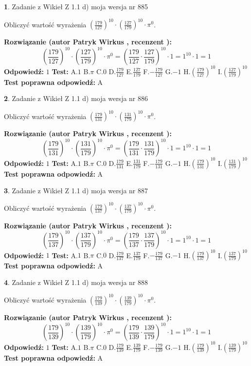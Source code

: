 \documentclass[12pt, a4paper]{article}
\theoremstyle{definition} %
\newtheorem{zad}{}
\newcommand{\zadStart}[1]{\begin{zad}#1\newline}
\newcommand{\zadStop}{\end{zad}}
\newcommand{\rozwStart}[2]{\noindent \textbf{Rozwiązanie (autor #1 , recenzent #2): }\newline}
\newcommand{\rozwStop}{\newline}
\newcommand{\odpStart}{\noindent \textbf{Odpowiedź:}\newline}
\newcommand{\odpStop}{\newline}
\newcommand{\testStart}{\noindent \textbf{Test:}\newline}
\newcommand{\testStop}{\newline}
\newcommand{\kluczStart}{\noindent \textbf{Test poprawna odpowiedź:}\newline}
\newcommand{\kluczStop}{\newline}
\begin{document}
\zadStart{Zadanie z Wikieł Z 1.1 d) moja wersja nr 885}

Obliczyć wartość wyrażenia $(\frac{179}{127})^{10} \cdot (\frac{127}{179})^{10} \cdot \pi^{0}$.
\zadStop
\rozwStart{Patryk Wirkus}{}
$$(\frac{179}{127})^{10} \cdot (\frac{127}{179})^{10} \cdot \pi^{0} = (\frac{179}{127} \cdot \frac{127}{179})^{10} \cdot 1 = 1^{10} \cdot 1 = 1$$
\rozwStop
\odpStart
$1$
\odpStop
\testStart
A.$1$ B.$\pi$ C.$0$ D.$\frac{179}{127}$ E.$\frac{127}{179}$
F.$-\frac{179}{127}$ G.$-1$
H.$(\frac{179}{127})^{10}$
I.$(\frac{127}{179})^{10}$
\testStop
\kluczStart
A
\kluczStop



\zadStart{Zadanie z Wikieł Z 1.1 d) moja wersja nr 886}

Obliczyć wartość wyrażenia $(\frac{179}{131})^{10} \cdot (\frac{131}{179})^{10} \cdot \pi^{0}$.
\zadStop
\rozwStart{Patryk Wirkus}{}
$$(\frac{179}{131})^{10} \cdot (\frac{131}{179})^{10} \cdot \pi^{0} = (\frac{179}{131} \cdot \frac{131}{179})^{10} \cdot 1 = 1^{10} \cdot 1 = 1$$
\rozwStop
\odpStart
$1$
\odpStop
\testStart
A.$1$ B.$\pi$ C.$0$ D.$\frac{179}{131}$ E.$\frac{131}{179}$
F.$-\frac{179}{131}$ G.$-1$
H.$(\frac{179}{131})^{10}$
I.$(\frac{131}{179})^{10}$
\testStop
\kluczStart
A
\kluczStop



\zadStart{Zadanie z Wikieł Z 1.1 d) moja wersja nr 887}

Obliczyć wartość wyrażenia $(\frac{179}{137})^{10} \cdot (\frac{137}{179})^{10} \cdot \pi^{0}$.
\zadStop
\rozwStart{Patryk Wirkus}{}
$$(\frac{179}{137})^{10} \cdot (\frac{137}{179})^{10} \cdot \pi^{0} = (\frac{179}{137} \cdot \frac{137}{179})^{10} \cdot 1 = 1^{10} \cdot 1 = 1$$
\rozwStop
\odpStart
$1$
\odpStop
\testStart
A.$1$ B.$\pi$ C.$0$ D.$\frac{179}{137}$ E.$\frac{137}{179}$
F.$-\frac{179}{137}$ G.$-1$
H.$(\frac{179}{137})^{10}$
I.$(\frac{137}{179})^{10}$
\testStop
\kluczStart
A
\kluczStop



\zadStart{Zadanie z Wikieł Z 1.1 d) moja wersja nr 888}

Obliczyć wartość wyrażenia $(\frac{179}{139})^{10} \cdot (\frac{139}{179})^{10} \cdot \pi^{0}$.
\zadStop
\rozwStart{Patryk Wirkus}{}
$$(\frac{179}{139})^{10} \cdot (\frac{139}{179})^{10} \cdot \pi^{0} = (\frac{179}{139} \cdot \frac{139}{179})^{10} \cdot 1 = 1^{10} \cdot 1 = 1$$
\rozwStop
\odpStart
$1$
\odpStop
\testStart
A.$1$ B.$\pi$ C.$0$ D.$\frac{179}{139}$ E.$\frac{139}{179}$
F.$-\frac{179}{139}$ G.$-1$
H.$(\frac{179}{139})^{10}$
I.$(\frac{139}{179})^{10}$
\testStop
\kluczStart
A
\kluczStop
\end{document}
